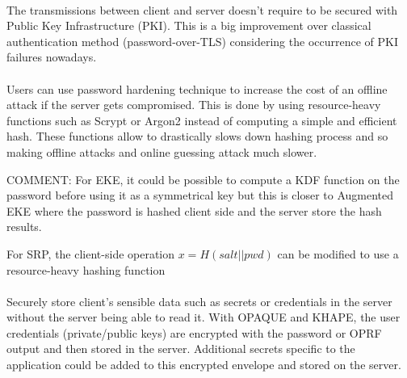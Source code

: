 \documentclass[../report.tex]{subfiles}
\begin{document}
\paragraph{} %
The transmissions between client and server doesn't require to be secured with Public Key Infrastructure (PKI). This is a big improvement over classical authentication method (password-over-TLS) considering the occurrence of PKI failures nowadays. %

\paragraph{}
Users can use password hardening technique to increase the cost of an offline attack if the server gets compromised. This is done by using resource-heavy functions such as Scrypt \cite{Scrypt_Paper} or Argon2 \cite{Argon2_Paper} instead of computing a simple and efficient hash. These functions allow to drastically slows down hashing process and so making offline attacks and online guessing attack much slower.

COMMENT: For EKE, it could be possible to compute a KDF function on the password before using it as a symmetrical key but this is closer to Augmented EKE \cite{AEKE_Paper} where the password is hashed client side and the server store the hash results.

For SRP, the client-side operation $x = H(salt||pwd)$ can be modified to use a resource-heavy hashing function \cite{https://blog.1password.com/developers-how-we-use-srp-and-you-can-too/}

\paragraph{}
Securely store client's sensible data such as secrets or credentials in the server without the server being able to read it. With OPAQUE and KHAPE, the user credentials (private/public keys) are encrypted with the password or OPRF output and then stored in the server. Additional secrets specific to the application could be added to this encrypted envelope and stored on the server.
\end{document}
